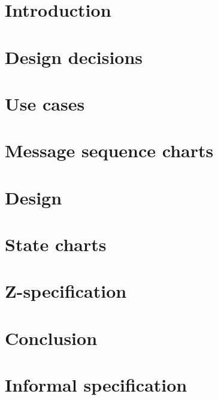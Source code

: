 \documentclass[a4paper,11pt]{article}
\begin{document}
	
	
	\tableofcontents
	\newpage
	
	\section{Introduction}
	
	\newpage

	\section{Design decisions}
	
	\newpage
	
	\section{Use cases}
	
	\newpage

	\section{Message sequence charts}
	
	\newpage

	\section{Design}
	
	\newpage

	\section{State charts}
	
	\newpage

	\section{Z-specification}
	
	\newpage

	\section{Conclusion}
	
	\newpage

	\appendix
	\section{Informal specification}
		\label{appendix:informal}
		
\end{document}
